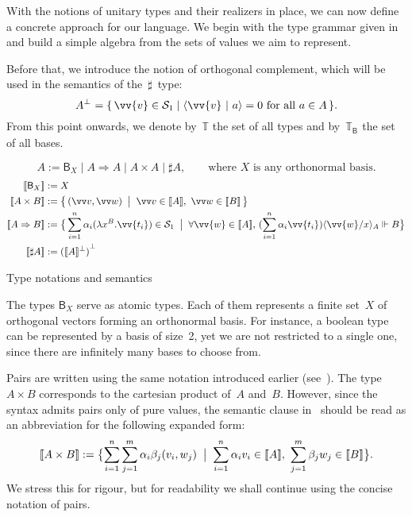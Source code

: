 \documentclass[runningheads,orivec,envcountsame,envcountsect]{llncs}
\newcommand\comp[2][]{#2^{\bot^{#1}}}
\newcommand\ansubst[2]{\ensuremath{\langle #1 \rangle_{#2}}}
\def\Sph{\mathcal{S}_1}       %
\def\scal#1#2{\langle{#1}~|~{#2}\rangle}
\def\Lam#1#2#3{\lambda#1^{#2}{.}#3} %
\def\Arr{\Rightarrow}
\def\Type{\mathbb{T}}
\def\BasisType{\Type_{\basis{}}}
\def\sem#1{\llbracket#1\rrbracket}
\def\real{\Vdash}
\newcommand\basis[1]{\ensuremath{\mathsf{B}_{#1}}}
\begin{document}
With the notions of unitary types and their realizers in place, we can now
define a concrete approach for our language. We begin with the type grammar
given in~ and build a simple algebra from the sets of
values we aim to represent.

Before that, we introduce the notion of orthogonal complement, which will be
used in the semantics of the~$\sharp$~type:
\[
  \comp{A} = \{\, \vv{v}\in \Sph \mid \scal{\vv{v}}{a} = 0 \text{ for all } a\in A\,\}.
\]
From this point onwards, we denote by~$\Type$ the set of all types and
by~$\BasisType$ the set of all bases.

\begin{table}[t]
  \[
    A := \basis{X} \mid A\Arr A \mid A\times A \mid \sharp A,
    \qquad\text{where $X$ is any orthonormal basis.}
  \]
  \begin{align*}
    \sem{\basis{X}}&:= X\\
    \sem{A\times B}&:= \bigl\{\,(\vv v, \vv w)\;\bigm|\; \vv v\in\sem{A},~\vv w\in\sem{B}\,\bigr\}\\
    \sem{A\Arr B}&:=
    \bigl\{\,\sum_{i=1}^{n}\alpha_i(\Lam{x}{B}{\vv{t_i}})\in\Sph
      \;\bigm|\;
      \forall\vv{w}\in\sem{A},\,
      (\sum_{i=1}^{n}\alpha_i \vv{t_i})\ansubst{\vv{w}/x}{A}\real B
    \bigr\}\\
    \sem{\sharp A}&:= {(\sem{A}^\bot)}^\bot
  \end{align*}
  \caption{Type notations and semantics}
  \label{tab:UnitaryTypes}
\end{table}

The types $\basis{X}$ serve as atomic types. Each of them represents a finite
set~$X$ of orthogonal vectors forming an orthonormal basis. For instance, a
boolean type can be represented by a basis of size~2, yet we are not restricted
to a single one, since there are infinitely many bases to choose from.

Pairs are written using the same notation introduced earlier
(see~).  The type~$A\times B$ corresponds to the
cartesian product of~$A$ and~$B$.  However, since the syntax admits pairs only
of pure values, the semantic clause in~ should be read
as an abbreviation for the following expanded form:
\[
  \sem{A\times B}
  := \bigl\{
       \sum_{i=1}^{n}\sum_{j=1}^{m}\alpha_i\beta_j(v_i,w_j)
       \;\bigm|\;
       \sum_{i=1}^{n}\alpha_i v_i\in\sem{A},~
       \sum_{j=1}^{m}\beta_j w_j\in\sem{B}
     \bigr\}.
\]
We stress this for rigour, but for readability we shall continue using the
concise notation of pairs.
\end{document}
